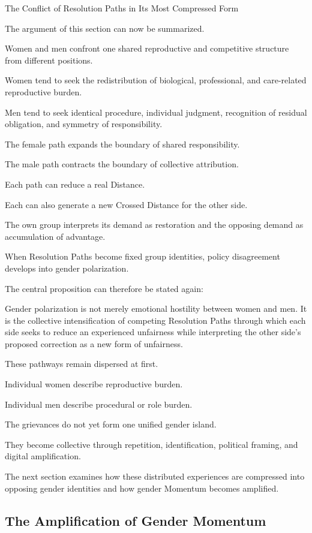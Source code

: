 The Conflict of Resolution Paths in Its Most Compressed Form

The argument of this section can now be summarized.

Women and men confront one shared reproductive and competitive structure from different positions.

Women tend to seek the redistribution of biological, professional, and care-related reproductive burden.

Men tend to seek identical procedure, individual judgment, recognition of residual obligation, and symmetry of responsibility.

The female path expands the boundary of shared responsibility.

The male path contracts the boundary of collective attribution.

Each path can reduce a real Distance.

Each can also generate a new Crossed Distance for the other side.

The own group interprets its demand as restoration and the opposing demand as accumulation of advantage.

When Resolution Paths become fixed group identities, policy disagreement develops into gender polarization.

The central proposition can therefore be stated again:

Gender polarization is not merely emotional hostility between women and men. It is the collective intensification of competing Resolution Paths through which each side seeks to reduce an experienced unfairness while interpreting the other side’s proposed correction as a new form of unfairness.

These pathways remain dispersed at first.

Individual women describe reproductive burden.

Individual men describe procedural or role burden.

The grievances do not yet form one unified gender island.

They become collective through repetition, identification, political framing, and digital amplification.

The next section examines how these distributed experiences are compressed into opposing gender identities and how gender Momentum becomes amplified.

\subsection*{\textbf{The Amplification of Gender Momentum}} 

